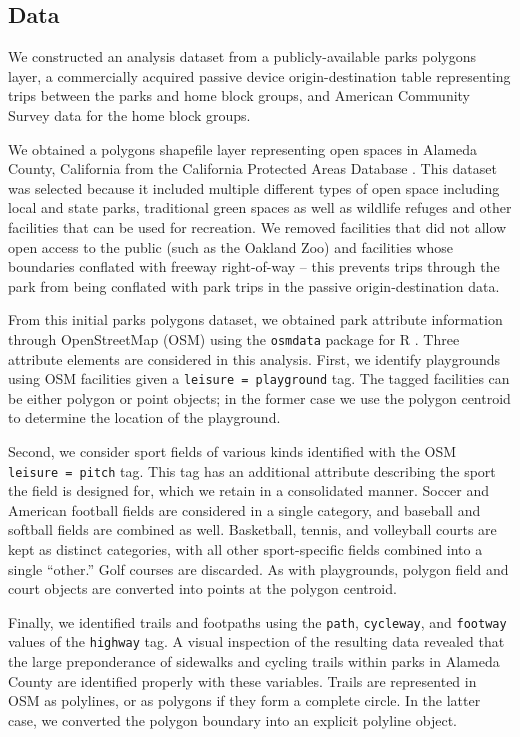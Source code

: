 \documentclass[3p, authoryear, review]{elsarticle} %
\begin{document}
\hypertarget{data}{%
\subsection{Data}\label{data}}

We constructed an analysis dataset from a publicly-available parks polygons
layer, a commercially acquired passive device origin-destination table
representing trips between the parks and home block groups, and American
Community Survey data for the home block groups.

We obtained a polygons shapefile layer representing open spaces in Alameda
County, California from the California Protected Areas Database \citep{cpad2019}.
This dataset was selected because it included multiple different types of open
space including local and state parks, traditional green spaces as well as
wildlife refuges and other facilities that can be used for recreation. We
removed facilities that did not allow open access to the public (such as the
Oakland Zoo) and facilities whose boundaries conflated with freeway right-of-way
-- this prevents trips through the park from being conflated with park trips in
the passive origin-destination data.

From this initial parks polygons dataset, we obtained park attribute information
through OpenStreetMap (OSM) using the \texttt{osmdata} package for R \citep{osmdata}. Three
attribute elements are considered in this analysis. First, we identify playgrounds
using OSM facilities given a \texttt{leisure\ =\ playground} tag. The tagged facilities can
be either polygon or point objects; in the former case we use the polygon centroid
to determine the location of the playground.

Second, we consider sport fields of various kinds identified with the OSM
\texttt{leisure\ =\ pitch} tag. This tag has an additional attribute describing the sport
the field is designed for, which we retain in a consolidated manner. Soccer and
American football fields are considered in a single category, and baseball and
softball fields are combined as well. Basketball, tennis, and volleyball courts
are kept as distinct categories, with all other sport-specific fields combined
into a single ``other.'' Golf courses are discarded. As with playgrounds, polygon
field and court objects are converted into points at the polygon centroid.

Finally, we identified trails and footpaths using the \texttt{path}, \texttt{cycleway}, and
\texttt{footway} values of the \texttt{highway} tag. A visual inspection of the resulting data
revealed that the large preponderance of sidewalks and cycling trails within parks
in Alameda County are identified properly with these variables. Trails are
represented in OSM as polylines, or as polygons if they form a complete circle.
In the latter case, we converted the polygon boundary into an explicit polyline object.
\end{document}
